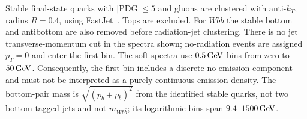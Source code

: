 Stable final-state quarks with $|\mathrm{PDG}|\le5$ and gluons are
clustered with anti-$k_T$, radius $R=0.4$, using
FastJet~\cite{AntiKt,FastJet}. Tops are excluded. For $Wb\bar b$ the
stable bottom and antibottom are also removed before radiation-jet
clustering. There is no jet transverse-momentum cut in the spectra
shown; no-radiation events are assigned $p_T=0$ and enter the first
bin. The soft spectra use $0.5\,\mathrm{GeV}$ bins from zero to $50\,\mathrm{GeV}$.
Consequently, the first bin includes a discrete no-emission component
and must not be interpreted as a purely continuous emission density.
The bottom-pair mass is $\sqrt{(p_b+p_{\bar b})^2}$ from the identified
stable quarks, not two bottom-tagged jets and not $m_{Wb\bar b}$;
its logarithmic bins span $9.4$--$1500\,\mathrm{GeV}$.
